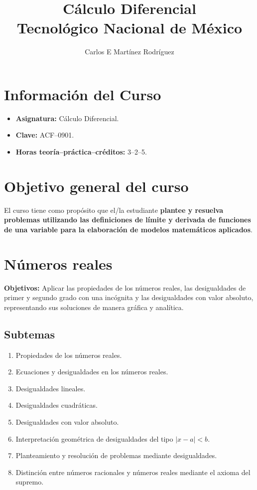 \documentclass[12pt]{article}
\title{\textbf{Cálculo Diferencial}\\[0.3cm]
\large Tecnológico Nacional de México}
\author{Carlos E Mart\'inez Rodr\'iguez}
\date{}
\begin{document}
\maketitle
\tableofcontents

\section*{Informaci\'on del Curso}

\begin{itemize}
    \item \textbf{Asignatura:} Cálculo Diferencial.
    \item \textbf{Clave:} ACF--0901.
    \item \textbf{Horas teoría--práctica--créditos:} 3--2--5.
\end{itemize}

\section*{Objetivo general del curso}

El curso tiene como propósito que el/la estudiante \textbf{plantee y resuelva problemas utilizando las definiciones de límite y derivada de funciones de una variable para la elaboración de modelos matemáticos aplicados}.


\section{Números reales}

\textbf{Objetivos:} Aplicar las propiedades de los números reales, las desigualdades de primer y segundo grado con una incógnita y las desigualdades con valor absoluto, representando sus soluciones de manera gráfica y analítica.

\subsection{Subtemas}

\begin{enumerate}
    \item Propiedades de los números reales.
    \item Ecuaciones y desigualdades en los números reales.
    \item Desigualdades lineales.
    \item Desigualdades cuadráticas.
    \item Desigualdades con valor absoluto.
    \item Interpretación geométrica de desigualdades del tipo $|x-a|<b$.
    \item Planteamiento y resolución de problemas mediante desigualdades.
    \item Distinción entre números racionales y números reales mediante el axioma del supremo.
\end{enumerate}
\end{document}
